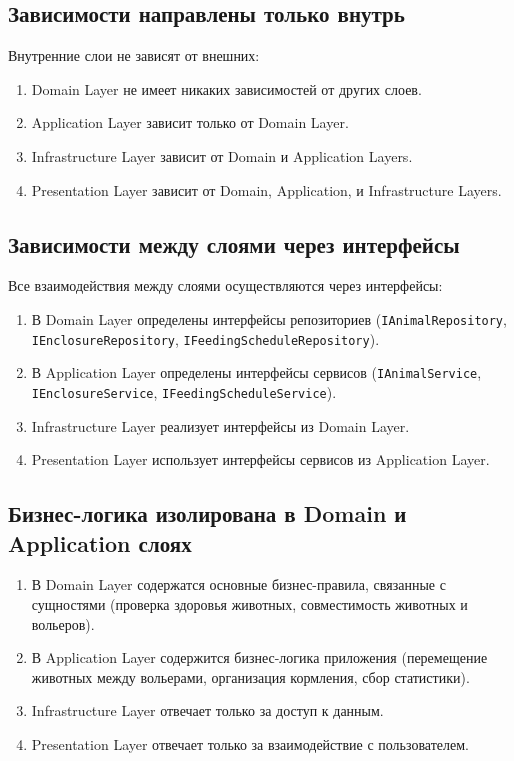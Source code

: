 \documentclass[a4paper,12pt]{article}
\begin{document}
\subsection{Зависимости направлены только внутрь}

Внутренние слои не зависят от внешних:
\begin{enumerate}
    \item Domain Layer не имеет никаких зависимостей от других слоев.
    \item Application Layer зависит только от Domain Layer.
    \item Infrastructure Layer зависит от Domain и Application Layers.
    \item Presentation Layer зависит от Domain, Application, и Infrastructure Layers.
\end{enumerate}

\subsection{Зависимости между слоями через интерфейсы}

Все взаимодействия между слоями осуществляются через интерфейсы:

\begin{enumerate}
    \item В Domain Layer определены интерфейсы репозиториев (\texttt{IAnimalRepository}, \texttt{IEnclosureRepository}, \texttt{IFeedingScheduleRepository}).
    \item В Application Layer определены интерфейсы сервисов (\texttt{IAnimalService}, \texttt{IEnclosureService}, \texttt{IFeedingScheduleService}).
    \item Infrastructure Layer реализует интерфейсы из Domain Layer.
    \item Presentation Layer использует интерфейсы сервисов из Application Layer.
\end{enumerate}

\subsection{Бизнес-логика изолирована в Domain и Application слоях}

\begin{enumerate}
    \item В Domain Layer содержатся основные бизнес-правила, связанные с сущностями (проверка здоровья животных, совместимость животных и вольеров).
    \item В Application Layer содержится бизнес-логика приложения (перемещение животных между вольерами, организация кормления, сбор статистики).
    \item Infrastructure Layer отвечает только за доступ к данным.
    \item Presentation Layer отвечает только за взаимодействие с пользователем.
\end{enumerate}
\end{document}

